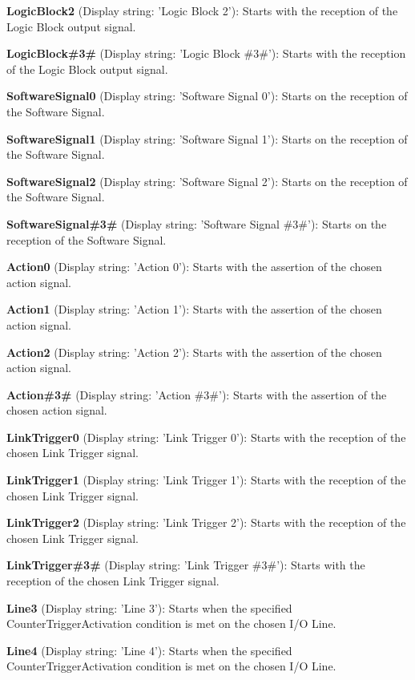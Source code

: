 \begin{DoxyItemize}
\item {\bfseries Logic\+Block2} (Display string\+: 'Logic Block 2')\+: Starts with the reception of the Logic Block output signal.
\item {\bfseries Logic\+Block\#3\#} (Display string\+: 'Logic Block \#3\#')\+: Starts with the reception of the Logic Block output signal.
\item {\bfseries Software\+Signal0} (Display string\+: 'Software Signal 0')\+: Starts on the reception of the Software Signal.
\item {\bfseries Software\+Signal1} (Display string\+: 'Software Signal 1')\+: Starts on the reception of the Software Signal.
\item {\bfseries Software\+Signal2} (Display string\+: 'Software Signal 2')\+: Starts on the reception of the Software Signal.
\item {\bfseries Software\+Signal\#3\#} (Display string\+: 'Software Signal \#3\#')\+: Starts on the reception of the Software Signal.
\item {\bfseries Action0} (Display string\+: 'Action 0')\+: Starts with the assertion of the chosen action signal.
\item {\bfseries Action1} (Display string\+: 'Action 1')\+: Starts with the assertion of the chosen action signal.
\item {\bfseries Action2} (Display string\+: 'Action 2')\+: Starts with the assertion of the chosen action signal.
\item {\bfseries Action\#3\#} (Display string\+: 'Action \#3\#')\+: Starts with the assertion of the chosen action signal.
\item {\bfseries Link\+Trigger0} (Display string\+: 'Link Trigger 0')\+: Starts with the reception of the chosen Link Trigger signal.
\item {\bfseries Link\+Trigger1} (Display string\+: 'Link Trigger 1')\+: Starts with the reception of the chosen Link Trigger signal.
\item {\bfseries Link\+Trigger2} (Display string\+: 'Link Trigger 2')\+: Starts with the reception of the chosen Link Trigger signal.
\item {\bfseries Link\+Trigger\#3\#} (Display string\+: 'Link Trigger \#3\#')\+: Starts with the reception of the chosen Link Trigger signal.
\item {\bfseries Line3} (Display string\+: 'Line 3')\+: Starts when the specified Counter\+Trigger\+Activation condition is met on the chosen I/\+O Line.
\item {\bfseries Line4} (Display string\+: 'Line 4')\+: Starts when the specified Counter\+Trigger\+Activation condition is met on the chosen I/\+O Line.

\end{DoxyItemize}
